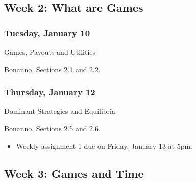\documentclass[
]{article}
\providecommand{\tightlist}{%
  \setlength{\itemsep}{0pt}\setlength{\parskip}{0pt}}
\begin{document}
\hypertarget{week-2-what-are-games}{%
\subsection{Week 2: What are Games}\label{week-2-what-are-games}}

\begin{multicols}{2}

\hypertarget{tuesday-january-10}{%
\subsubsection{Tuesday, January 10}\label{tuesday-january-10}}

\begin{description}
\tightlist
\item[Topic]
Games, Payouts and Utilities
\item[Reading]
Bonanno, Sections 2.1 and 2.2.
\end{description}

\hypertarget{thursday-january-12}{%
\subsubsection{Thursday, January 12}\label{thursday-january-12}}

\begin{description}
\tightlist
\item[Topic]
Dominant Strategies and Equilibria
\item[Reading]
Bonanno, Sections 2.5 and 2.6.
\end{description}

\end{multicols}

\begin{itemize}
\tightlist
\item
  Weekly assignment 1 due on Friday, January 13 at 5pm.
\end{itemize}

\hypertarget{week-3-games-and-time}{%
\subsection{Week 3: Games and Time}\label{week-3-games-and-time}}
\end{document}
